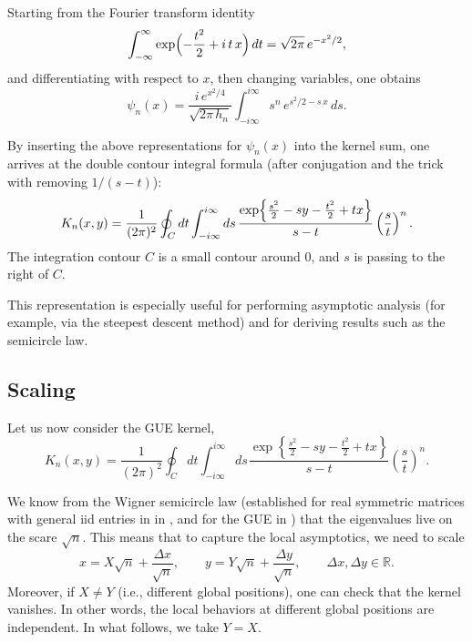 \documentclass[letterpaper,11pt,oneside,reqno]{book}
\numberwithin{equation}{chapter}  %
\newcommand{\ssp}{\hspace{1pt}}
\theoremstyle{definition}
\begin{document}
Starting from the Fourier transform identity
\[
\int_{-\infty}^{\infty} \exp\Bigl(-\frac{t^2}{2}+i\,t\,x\Bigr)\,dt
=\sqrt{2\pi}\,e^{-x^2/2},
\]
and differentiating with respect to \(x\), then changing variables, one obtains
\[
\psi_n(x)=\frac{i\,e^{x^2/4}}{\sqrt{2\pi\,h_n}}
\int_{-i\infty}^{i\infty} s^n\,e^{s^2/2- s\,x}\,ds.
\]

By inserting the above representations for \(\psi_n(x)\) into the kernel sum, one arrives at the double contour integral formula
(after conjugation and the trick with removing $1 / (s-t)$):
\[
K_n(x,y)=\frac{1}{(2\pi)^2}
\oint_C dt\int_{-i\infty}^{i\infty}ds\,
\frac{\exp\Bigl\{\frac{s^2}{2}-sy-\frac{t^2}{2}+tx\Bigr\}}{s-t}\left(\frac{s}{t}\right)^n.
\]
The integration contour $C$ is a small contour around $0$, and
$s$ is passing to the right of $C$.

This representation is especially useful for performing asymptotic analysis (for example, via the steepest descent method) and for deriving results such as the semicircle law.


\subsection{Scaling}
\label{lecture7:sub:scaling}

Let us now consider the GUE kernel,
\begin{equation*}
	K_n(x,y)=\frac{1}{(2\pi)^2}
	\oint_C dt\int_{-i\infty}^{i\infty}ds\ssp
	\frac{\exp\left\{ \frac{s^2}{2}-sy-\frac{t^2}{2}+tx \right\}}{s-t}\left( \frac{s}{t} \right)^n
	.
\end{equation*}

We know from the Wigner semicircle law
(established for real symmetric matrices with general iid entries in
in ,
and for the GUE in )
that the eigenvalues live on the scare $\sqrt n$. This means that to capture the local asymptotics,
we need to scale
\begin{equation}
	\label{lecture7:eq:scaling_x-y}
	x=X\sqrt n+\frac{\Delta x}{\sqrt n},\qquad y=Y\sqrt n+\frac{\Delta y}{\sqrt n},\qquad
	\Delta x,\Delta y\in\mathbb{R}.
\end{equation}
Moreover, if $X\ne Y$ (i.e., different global positions), one can check that the kernel
vanishes. In other words, the local behaviors at different global positions are independent.
In what follows, we take $Y=X$.
\end{document}
